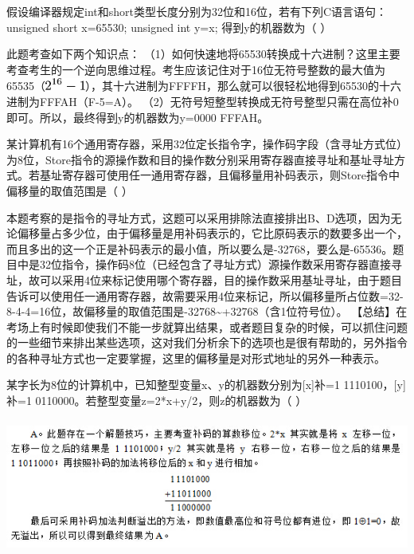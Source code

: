 \question 假设编译器规定int和short类型长度分别为32位和16位，若有下列C语言语句：
unsigned short x=65530; unsigned int y=x; 得到y的机器数为（ ）
\par{}
\begin{solution}此题考查如下两个知识点：
（1）如何快速地将65530转换成十六进制？这里主要考查考生的一个逆向思维过程。考生应该记住对于16位无符号整数的最大值为65535（\includegraphics[width=0.52083in,height=0.16667in]{texmath/6c24d85Cdpi7B3507D25E7B167D-1}），其十六进制为FFFFH，那么就可以很轻松地得到65530的十六进制为FFFAH（F-5=A）。
（2）无符号短整型转换成无符号整型只需在高位补0即可。所以，最终得到y的机器数为y=0000
FFFAH。
\end{solution}
\question 某计算机有16个通用寄存器，采用32位定长指令字，操作码字段（含寻址方式位）为8位，Store指令的源操作数和目的操作数分别采用寄存器直接寻址和基址寻址方式。若基址寄存器可使用任一通用寄存器，且偏移量用补码表示，则Store指令中偏移量的取值范围是（
）
\par{}
\begin{solution}本题考察的是指令的寻址方式，这题可以采用排除法直接排出B、D选项，因为无论偏移量占多少位，由于偏移量是用补码表示的，它比原码表示的数要多出一个，而且多出的这一个正是补码表示的最小值，所以要么是-32768，要么是-65536。题目中是32位指令，操作码8位（已经包含了寻址方式）源操作数采用寄存器直接寻址，故可以采用4位来标记使用哪个寄存器，目的操作数采用基址寻址，由于题目告诉可以使用任一通用寄存器，故需要采用4位来标记，所以偏移量所占位数=32-8-4-4=16位，故偏移量的取值范围是-32768\textasciitilde{}+32768（含1位符号位）。
【总结】在考场上有时候即使我们不能一步就算出结果，或者题目复杂的时候，可以抓住问题的一些细节来排出某些选项，这对我们分析余下的选项也是很有帮助的，另外指令的各种寻址方式也一定要掌握，这里的偏移量是对形式地址的另外一种表示。
\end{solution}
\question 某字长为8位的计算机中，已知整型变量x、y的机器数分别为{[}x{]}补=1
1110100，{[}y{]}补=1 0110000。若整型变量z=2*x+y/2，则z的机器数为（ ）
\par{}
\begin{solution}\includegraphics[width=5.73958in,height=1.75000in]{computerassets/f7aa3d33b4082cc7a9bf16eae72bd2a3.jpeg}
\end{solution}

